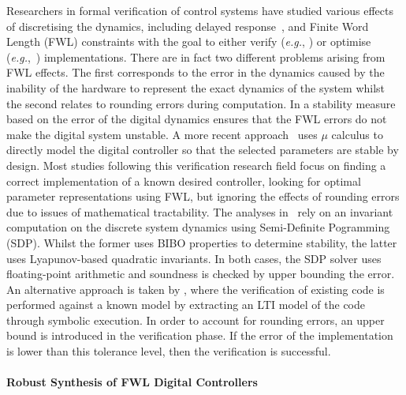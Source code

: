 \documentclass{sig-alternate-05-2015}
\begin{document}
Researchers in formal verification of control systems have studied
various effects of discretising the dynamics, including delayed
response~\cite{Duggirala2015}, and Finite Word Length (FWL) constraints with
the goal to either verify ({\it e.g.},  \cite{daes20161}) or optimise
({\it e.g.},~\cite{oudjida2014design}) implementations.  There are in fact two
different problems arising from FWL effects.  The first corresponds to the
error in the dynamics caused by the inability of the hardware to represent
the exact dynamics of the system whilst the second relates to rounding
errors during computation.  In \cite{fialho1994stability} a stability
measure based on the error of the digital dynamics ensures that the FWL
errors do not make the digital system unstable.  A more recent
approach~\cite{DBLP:journals/automatica/WuLCC09} uses $\mu$ calculus to
directly model the digital controller so that the selected parameters are
stable by design.  Most studies following this verification research field focus on
finding a correct implementation of a known desired controller, looking for
optimal parameter representations using FWL, but ignoring the effects of
rounding errors due to issues of mathematical tractability.  The analyses
in~\cite{DBLP:conf/hybrid/WangGRJF16,DBLP:conf/hybrid/RouxJG15} rely on an
invariant computation on the discrete system dynamics using Semi-Definite
Pogramming (SDP).  Whilst the former uses BIBO properties to determine
stability, the latter uses Lyapunov-based quadratic invariants.  In both
cases, the SDP solver uses floating-point arithmetic and soundness is checked
by upper bounding the error.
An alternative approach is taken by \cite{park2016scalable}, where the verification of existing
code is performed against a known model by extracting an LTI model of the
code through symbolic execution. In order to account for rounding errors, an
upper bound is introduced in the verification phase. If the error of the implementation
is lower than this tolerance level, then the verification is successful. 

\paragraph{Robust Synthesis of FWL Digital Controllers}
\end{document}
